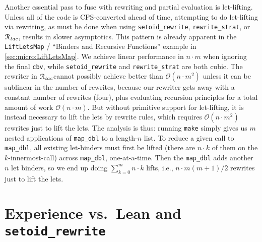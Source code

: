 \documentclass[a4paper,USenglish,cleveref,autoref,thm-restate]{lipics-v2021}
\newcommand{\Rtac}{\ensuremath{\mathcal{R}_\text{\emph{tac}}}}
\newcommand{\taccbv}{\texttt{cbv}}
\begin{document}
\begin{minipage}[t][1cm]{\textwidth}
Another essential pass to fuse with rewriting and partial evaluation is let-lifting.
Unless all of the code is CPS-converted ahead of time, attempting to do let-lifting via rewriting, as must be done when using \texttt{setoid_rewrite}, \texttt{rewrite_strat}, or \Rtac, results in slower asymptotics.
This pattern is already apparent in the \texttt{LiftLetsMap} / ``Binders and Recursive Functions'' example in \autoref{sec:micro:LiftLetsMap}.
We achieve linear performance in $n\cdot m$ when ignoring the final \taccbv, while \texttt{setoid_rewrite} and \texttt{rewrite_strat} are both cubic.
The rewriter in \Rtac\space cannot possibly achieve better than $\mathcal{O}\left(n\cdot m^2\right)$ unless it can be sublinear in the number of rewrites, because our rewriter gets away with a constant number of rewrites (four), plus evaluating recursion principles for a total amount of work $\mathcal{O}(n\cdot m)$.
But without primitive support for let-lifting, it is instead necessary to lift the lets by rewrite rules, which requires
$\mathcal{O}\left(n\cdot m^2\right)$ rewrites just to lift the lets.
The analysis is thus: running \texttt{make} simply gives us $m$ nested applications of \texttt{map\_dbl} to a length-$n$ list.
To reduce a given call to \texttt{map\_dbl}, all existing let-binders must first be lifted (there are $n\cdot k$ of them on the $k$-innermost-call) across \texttt{map\_dbl}, one-at-a-time.
Then the \texttt{map\_dbl} adds another $n$ let binders, so we end up doing $\sum_{k=0}^{m} n\cdot k$ lifts, i.e., $n\cdot m(m+1)/2$ rewrites just to lift the lets.

\section{Experience vs.\ Lean and \texorpdfstring{\texttt{setoid\_rewrite}}{setoid\_rewrite}\label{sec:lean}}


\end{minipage}
\end{document}
